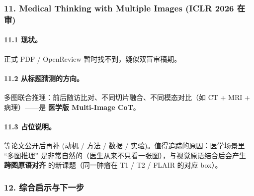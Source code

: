 \subsubsection*{11. Medical Thinking with Multiple Images (ICLR 2026 在审)}

\paragraph{11.1 现状。}
正式 PDF / OpenReview 暂时找不到，疑似双盲审稿期。

\paragraph{11.2 从标题猜测的方向。}
多图联合推理：前后随访比对、不同切片融合、不同模态对比（如 CT + MRI + 病理）——是 \textbf{医学版 Multi-Image CoT}。

\paragraph{11.3 占位说明。}
等论文公开后再补 (动机 / 方法 / 数据 / 实验)。值得追踪的原因：医学场景里 ``多图推理'' 是非常自然的（医生从来不只看一张图），与视觉原语结合后会产生 \textbf{跨图原语对齐} 的新课题（同一肿瘤在 T1 / T2 / FLAIR 的对应 box）。

\subsubsection*{12. 综合启示与下一步}

